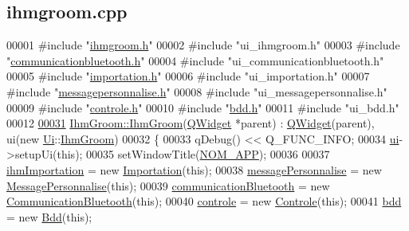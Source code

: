 \hypertarget{ihmgroom_8cpp_source}{}\subsection{ihmgroom.\+cpp}

\begin{DoxyCode}
00001 \textcolor{preprocessor}{#include "\hyperlink{ihmgroom_8h}{ihmgroom.h}"}
00002 \textcolor{preprocessor}{#include "ui\_ihmgroom.h"}
00003 \textcolor{preprocessor}{#include "\hyperlink{communicationbluetooth_8h}{communicationbluetooth.h}"}
00004 \textcolor{preprocessor}{#include "ui\_communicationbluetooth.h"}
00005 \textcolor{preprocessor}{#include "\hyperlink{importation_8h}{importation.h}"}
00006 \textcolor{preprocessor}{#include "ui\_importation.h"}
00007 \textcolor{preprocessor}{#include "\hyperlink{messagepersonnalise_8h}{messagepersonnalise.h}"}
00008 \textcolor{preprocessor}{#include "ui\_messagepersonnalise.h"}
00009 \textcolor{preprocessor}{#include "\hyperlink{controle_8h}{controle.h}"}
00010 \textcolor{preprocessor}{#include "\hyperlink{bdd_8h}{bdd.h}"}
00011 \textcolor{preprocessor}{#include "ui\_bdd.h"}
00012 
\hyperlink{class_ihm_groom_a44887622008d41828025e2b2ccd598a7}{00031} \hyperlink{class_ihm_groom_a44887622008d41828025e2b2ccd598a7}{IhmGroom::IhmGroom}(\hyperlink{class_q_widget}{QWidget} *parent) : \hyperlink{class_q_widget}{QWidget}(parent), ui(new 
      \hyperlink{namespace_ui}{Ui}::\hyperlink{class_ihm_groom}{IhmGroom})
00032 \{
00033     qDebug() << Q\_FUNC\_INFO;
00034     \hyperlink{class_ihm_groom_af652e1ce199213b7867e44cf589c06b8}{ui}->setupUi(\textcolor{keyword}{this});
00035     setWindowTitle(\hyperlink{ihmgroom_8h_ada54de88f03c1264af632974a72cff76}{NOM\_APP});
00036 
00037     \hyperlink{class_ihm_groom_ab3f9d16d3e20234a71b1580d70ee4959}{ihmImportation} = \textcolor{keyword}{new} \hyperlink{class_importation}{Importation}(\textcolor{keyword}{this});
00038     \hyperlink{class_ihm_groom_a529729b93d7b8d17147d3b47fe9a274d}{messagePersonnalise} = \textcolor{keyword}{new} \hyperlink{class_message_personnalise}{MessagePersonnalise}(\textcolor{keyword}{this});
00039     \hyperlink{class_ihm_groom_a8e2b551df75d8dffdfbc9beb6c3691ba}{communicationBluetooth} = \textcolor{keyword}{new} \hyperlink{class_communication_bluetooth}{CommunicationBluetooth}(\textcolor{keyword}{this});
00040     \hyperlink{class_ihm_groom_acead732c303b50a3285bd311ac8a3b4f}{controle} = \textcolor{keyword}{new} \hyperlink{class_controle}{Controle}(\textcolor{keyword}{this});
00041     \hyperlink{class_ihm_groom_aba1bfff9bc610e6a626d3af4cec266f9}{bdd} = \textcolor{keyword}{new} \hyperlink{class_bdd}{Bdd}(\textcolor{keyword}{this});

\end{DoxyCode}

